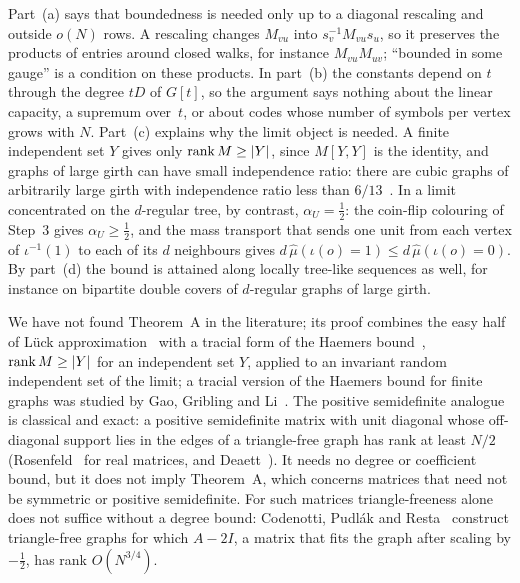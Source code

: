 \begin{remark}\label{rem:ana-A-ext}
Part~(a) says that boundedness is needed only up to a diagonal rescaling and outside $o(N)$ rows. A rescaling changes
$M_{vu}$ into $s_v^{-1}M_{vu}s_u$, so it preserves the products of entries around closed walks, for instance
$M_{vu}M_{uv}$; ``bounded in some gauge'' is a condition on these products. In part~(b) the constants depend on $t$
through the degree $tD$ of $G[t]$, so the argument says nothing about the linear capacity, a supremum over~$t$, or
about codes whose number of symbols per vertex grows with $N$. Part~(c) explains why the limit object is needed. A
finite independent set $Y$ gives only $\operatorname{rank} M\ge\lvert Y \rvert$, since $M[Y,Y]$ is the identity, and graphs of large girth
can have small independence ratio: there are cubic graphs of arbitrarily large girth with independence ratio less than
$6/13$~\cite{Bollobas1981}. In a limit concentrated on the $d$-regular tree, by contrast, $\alpha_U=\frac12$: the
coin-flip colouring of Step~3 gives $\alpha_U\ge\frac12$, and the mass transport that sends one unit from each vertex
of $\iota^{-1}(1)$ to each of its $d$ neighbours gives $d\,\hat\mu(\iota(o)=1)\le d\,\hat\mu(\iota(o)=0)$. By part~(d)
the bound is attained along locally tree-like sequences as well, for instance on bipartite double covers of $d$-regular
graphs of large girth.
\end{remark}

\begin{remark}[Literature]\label{rem:ana-A-lit}
We have not found Theorem~A in the literature; its proof combines the easy half of
L\"uck approximation~\cite{Luck1994,BLS2011} with a tracial form of the Haemers bound~\cite{Haemers1979},
$\operatorname{rank} M\ge\lvert Y \rvert$ for an independent set $Y$, applied to an invariant random independent set of the limit; a tracial
version of the Haemers bound for finite graphs was studied by Gao, Gribling and Li~\cite{GaoGriblingLi2022}. The
positive semidefinite analogue is classical and exact: a positive semidefinite matrix with unit diagonal whose
off-diagonal support lies in the edges of a triangle-free graph has rank at least $N/2$ (Rosenfeld~\cite{Rosenfeld1991}
for real matrices, and Deaett~\cite{Deaett2011}). It needs no degree or coefficient bound, but it does not imply
Theorem~A, which concerns matrices that need not be symmetric or positive semidefinite. For such matrices
triangle-freeness alone does not suffice without a degree bound: Codenotti, Pudl\'ak and Resta~\cite{CPR2000} construct
triangle-free graphs for which $A-2I$, a matrix that fits the graph after scaling by $-\frac12$, has rank
$O(N^{3/4})$.
\end{remark}

